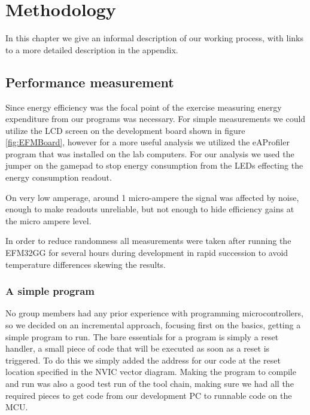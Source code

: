 \chapter{Methodology}

In this chapter we give an informal description of our working process, with links to a more detailed description in the appendix.

%

\section{Performance measurement}

Since energy efficiency was the focal point of the exercise measuring energy expenditure from our programs was necessary. For simple measurements we could utilize the LCD screen on the development board shown in figure \ref{fig:EFMBoard}, however for a more useful analysis we utilized the eAProfiler program that was installed on the lab computers. For our analysis we used the jumper on the gamepad to stop energy consumption from the LEDs effecting the energy consumption readout. 

On very low amperage, around 1 micro-ampere the signal was affected by noise, enough to make readouts unreliable, but not enough to hide efficiency gains at the micro ampere level.

In order to reduce randomness all measurements were taken after running the EFM32GG for several hours during development in rapid succession to avoid temperature differences skewing the results.

\subsection{A simple program}

No group members had any prior experience with programming microcontrollers, so we decided on an incremental approach, focusing first on the basics, getting a simple program to run. The bare essentials for a program is simply a reset handler, a small piece of code that will be executed as soon as a reset is triggered. To do this we simply added the address for our code at the reset location specified in the NVIC vector diagram. Making the program to compile and run was also a good test run of the tool chain, making sure we had all the required pieces to get code from our development PC to runnable code on the MCU. 

